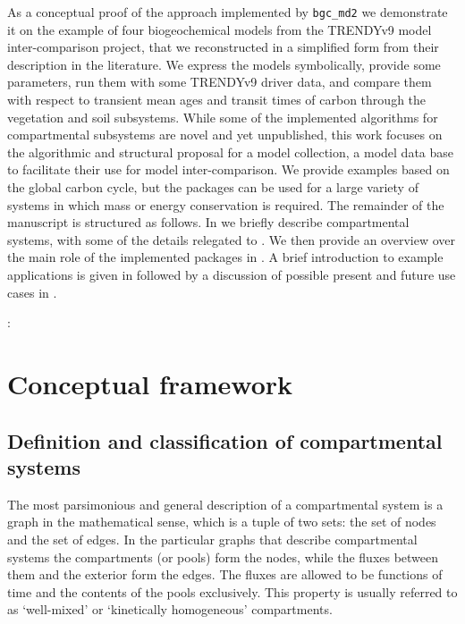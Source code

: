 As a conceptual proof of the  approach implemented by \texttt{bgc\_md2}
we demonstrate it on the example of four biogeochemical models from the TRENDYv9 \cite{GCB2020} model inter-comparison project, that we reconstructed in a simplified form from their description in the literature.
We express the models symbolically, provide some parameters, run them with some TRENDYv9 driver data, and
compare them with respect to transient mean ages and transit times of carbon
through the vegetation and soil subsystems.  
While some of the implemented algorithms for compartmental subsystems are novel 
and yet unpublished, this work focuses on the algorithmic and structural proposal for a model collection, \ie a model data base to facilitate their use for model inter-comparison. 
We provide examples based on the global carbon cycle, but the
packages can be used for a large variety of systems in which mass or energy
conservation is required.
The remainder of the manuscript is structured as follows.
In  we briefly describe compartmental systems, with some of the details
relegated to .
We then provide an overview over the main role of the implemented packages in 
. A brief introduction to example applications
is given in  followed by a discussion of
possible present and future use cases in
. 




:
\section{Conceptual framework}
\label{sec:ConceptualFramework}
\subsection{Definition and classification of compartmental systems} 

The most parsimonious and general description of a compartmental system is a graph in
the mathematical sense, which is a tuple of two sets: the set of nodes and the
set of edges. 
In the particular graphs that describe compartmental systems the
compartments (or pools) form the nodes, while the fluxes between them and the
exterior form the edges. The fluxes are allowed to be functions of time and the
contents of the pools exclusively. This property is usually referred to as `well-mixed' or
`kinetically homogeneous' compartments.  


